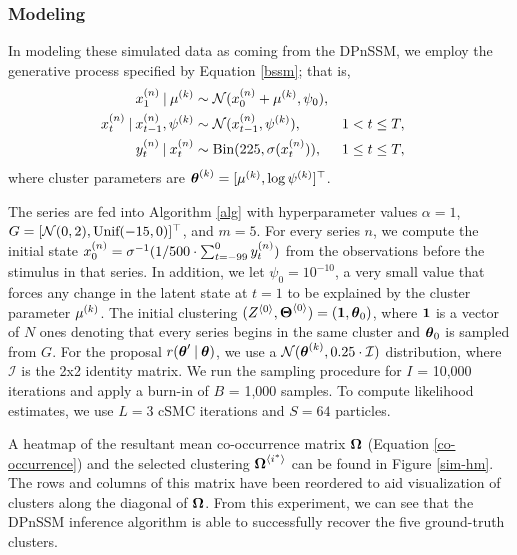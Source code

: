 \documentclass[twoside]{article}
\begin{document}
\subsubsection{Modeling} \label{sim-model-details}
In modeling these simulated data as coming from the DPnSSM, we employ the generative process specified by Equation \ref{bssm}; that is,
\begin{align} \label{sim-model}
\idx[1] x n \given \idx \mu k &\sim \Norm(\idx[0] x n + \idx \mu k, \psi_0),  \\ \nonumber
\idx[t] x n \given \idx[t-1] x n, \idx \psi k &\sim \Norm(\idx[t-1] x n, \idx \psi k), & & 1 < t \leq T, \\ \nonumber
\idx[t] y n \given \idx[t] x n &\sim \text{Bin}(225, \sigma(\idx[t] x n)), & & 1 \leq t \leq T, 
\end{align} 
where cluster parameters are $\bidx \theta k = [\idx \mu k, \log \idx \psi k]^\top$.  
 
The series are fed into Algorithm \ref{alg} with hyperparameter values $\alpha = 1$, $G = [\Norm(0, 2), \text{Unif}(-15, 0)]^\top$, and $m = 5$.  For every series $n$, we compute the initial state $\idx[0] x n = \sigma^{-1}(1 / 500 \cdot \sum_{t=-99}^{0} \idx[t] y n)$ from the observations before the stimulus in that series.  In addition, we let $\psi_0 = 10^{-10}$, a very small value that forces any change in the latent state at $t = 1$ to be explained by the cluster parameter $\idx \mu k$.  The initial clustering $(\aidx Z 0, \baidx \Theta 0) = (\bd 1, \bd \theta_0)$, where $\bd 1$ is a vector of $N$ ones denoting that every series begins in the same cluster and $\bd \theta_0$ is sampled from $G$.  For the proposal $r(\bd \theta' \given \bd \theta)$, we use a $\Norm(\bidx \theta k,  0.25 \cdot \mathcal{I})$ distribution, where $\mathcal{I}$ is the 2x2 identity matrix.  We run the sampling procedure for $I$ = 10,000 iterations and apply a burn-in of $B$ = 1,000 samples. To compute likelihood estimates, we use $L = 3$ cSMC iterations and $S = 64$ particles.  

A heatmap of the resultant mean co-occurrence matrix $\bd \Omega$ (Equation \ref{co-occurrence}) and the selected clustering $\baidx \Omega {i^*}$ can be found in Figure \ref{sim-hm}.  The rows and columns of this matrix have been reordered to aid visualization of clusters along the diagonal of $\bd \Omega$.  From this experiment, we can see that the DPnSSM inference algorithm is able to successfully recover the five ground-truth clusters.  
\end{document}
